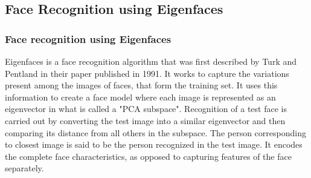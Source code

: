 \documentclass[%
        final,
        notitlepage,
        narroweqnarray,
        inline,
        ]{ieee}
\begin{document}
\subsection{Face Recognition using Eigenfaces}

\subsubsection{Face recognition using Eigenfaces}
Eigenfaces is a face recognition algorithm that was first described by Turk and Pentland in their paper published in 1991. It works to capture the variations present among the images of faces, that form the training set. It uses this information to create a face model where each image is represented as an eigenvector in what is called a "PCA subspace". Recognition of a test face is carried out by converting the test image into a similar eigenvector and then comparing its distance from all others in the subspace. The person corresponding to closest image is said to be the person recognized in the test image. It encodes the complete face characteristics, as opposed to capturing features of the face separately.\\
\end{document}
